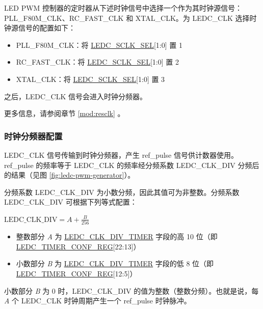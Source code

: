 \documentclass[main\_\_CN.tex]{subfiles}
\begin{document}
LED PWM 控制器的定时器从下述时钟信号中选择一个作为其时钟源信号：PLL\_F80M\_CLK、RC\_FAST\_CLK 和 XTAL\_CLK。为 LEDC\_CLK 选择时钟源信号的配置如下：

\begin{itemize}
    \item PLL\_F80M\_CLK：将 \hyperref[fielddesc:LEDCSCLKSEL]{LEDC\_SCLK\_SEL}[1:0] 置 1
    \item RC\_FAST\_CLK：将 \hyperref[fielddesc:LEDCSCLKSEL]{LEDC\_SCLK\_SEL}[1:0] 置 2
    \item XTAL\_CLK：将 \hyperref[fielddesc:LEDCSCLKSEL]{LEDC\_SCLK\_SEL}[1:0] 置 3
\end{itemize}

之后，LEDC\_CLK 信号会进入时钟分频器。

更多信息，请参阅章节 \ref{mod:resclk} \textit{}。

\subsubsection{时钟分频器配置}

LEDC\_CLK 信号传输到时钟分频器，产生 ref\_pulse 信号供计数器使用。ref\_pulse 的频率等于 LEDC\_CLK 的频率经分频系数 LEDC\_CLK\_DIV 分频后的结果（见图 \ref{fig:ledc-pwm-generator}）。

分频系数 LEDC\_CLK\_DIV 为小数分频，因此其值可为非整数。分频系数 LEDC\_CLK\_DIV 可根据下列等式配置：

\begin{center}
$\textrm{LEDC\_CLK\_DIV}= A + \frac{B}{256}$
\end{center}

\begin{itemize}
    \item 整数部分 \textit{A} 为 \hyperref[fielddesc:LEDCCLKDIVTIMERX]{LEDC\_CLK\_DIV\_TIMER} 字段的高 10 位（即 \hyperref[regdesc:LEDCTIMERXCONFREG]{LEDC\_TIMER\_CONF\_REG}[22:13]）
    \item 小数部分 \textit{B} 为 \hyperref[fielddesc:LEDCCLKDIVTIMERX]{LEDC\_CLK\_DIV\_TIMER} 字段的低 8 位（即 \hyperref[regdesc:LEDCTIMERXCONFREG]{LEDC\_TIMER\_CONF\_REG}[12:5]）
\end{itemize}

小数部分 \textit{B} 为 0 时，LEDC\_CLK\_DIV 的值为整数（整数分频）。也就是说，每 \textit{A} 个 LEDC\_CLK 时钟周期产生一个 ref\_pulse 时钟脉冲。
\end{document}
